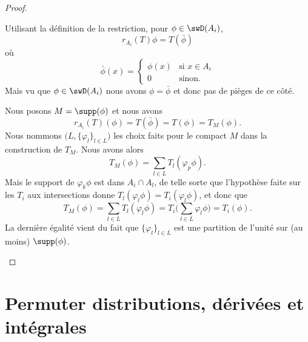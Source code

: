 \begin{proof}
\begin{subproof}
		Utilisant la définition de la restriction, pour \( \phi\in \swD(A_i)\),
		\begin{equation}
			r_{A_i}(T)\phi=T(\bar \phi)
		\end{equation}
		où
		\begin{equation}
			\bar\phi(x)=\begin{cases}
				\phi(x) & \text{si } x\in A_i \\
				0       & \text{sinon. }
			\end{cases}
		\end{equation}
		Mais vu que \( \phi\in \swD(A_i)\) nous avons \( \phi=\bar\phi\) et donc pas de pièges de ce côté.

		Nous posons \( M=\supp(\phi)\) et nous avons
		\begin{equation}
			r_{A_i}(T)(\phi)=T(\bar\phi)=T(\phi)=T_M(\phi).
		\end{equation}
		Nous nommons \( \big( L, \{ \varphi_l \}_{l\in L} \big)\) les choix faits pour le compact \( M\) dans la construction de \( T_M\). Nous avons alors
		\begin{equation}
			T_M(\phi)=\sum_{l\in L}T_l(\varphi_p\phi).
		\end{equation}
		Mais le support de \( \varphi_k\phi\) est dans \( A_i\cap A_l\), de telle sorte que l'hypothèse faite sur les \( T_i\) aux intersections donne \( T_l(\varphi_l\phi)=T_i(\varphi_l\phi)\), et donc que
		\begin{equation}
			T_M(\phi)=\sum_{l\in L}T_l(\varphi_l\phi)=T_i\big( \sum_{l\in L}\varphi_l\phi \big)=T_i(\phi).
		\end{equation}
		La dernière égalité vient du fait que \( \{ \varphi_l \}_{l\in L}\) est une partition de l'unité sur (au moins) \( \supp(\phi)\).
	\end{subproof}
\end{proof}

\section{Permuter distributions, dérivées et intégrales}

